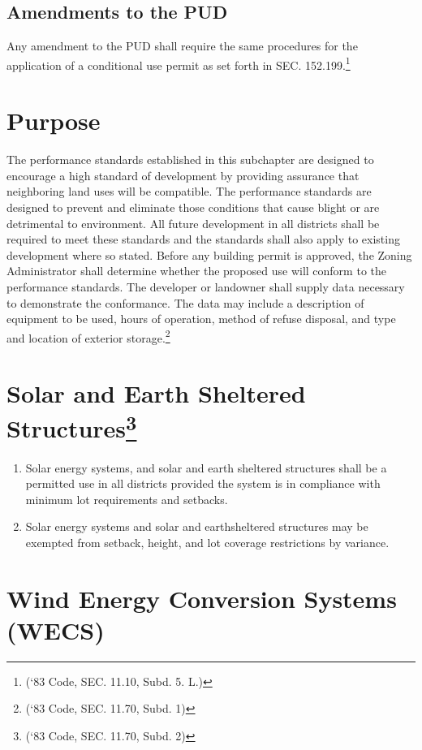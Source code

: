 \subsection{Amendments to the PUD}
Any amendment to the PUD shall require the same procedures for the application of a conditional use permit as set forth in SEC. 152.199.\footnote{(‘83 Code, SEC. 11.10, Subd. 5. L.)}


\setcounter{section}{154}
\section{Purpose}
The performance standards established in this subchapter are designed to encourage a high standard of development by providing assurance that neighboring land uses will be compatible. The performance standards are designed to prevent and eliminate those conditions that cause blight or are detrimental to environment. All future development in all districts shall be required to meet these standards and the standards shall also apply to existing development where so stated. Before any building permit is approved, the Zoning Administrator shall determine whether the proposed use will conform to the performance standards. The developer or landowner shall supply data necessary to demonstrate the conformance.  The data may include a description of equipment to be used, hours of operation, method of refuse disposal, and type and location of exterior storage.\footnote{(‘83 Code, SEC. 11.70, Subd. 1)}
\section{Solar and Earth Sheltered Structures\footnote{(‘83 Code, SEC. 11.70, Subd. 2)}}
\begin{enumerate}[{\indent}A)]
    \item Solar energy systems, and solar and earth sheltered structures shall be a permitted use in all districts provided the system is in compliance with minimum lot requirements and setbacks.
    \item Solar energy systems and solar and earthsheltered structures may be exempted from setback, height, and lot coverage restrictions by variance.
\end{enumerate}
\section{Wind Energy Conversion Systems (WECS)}
